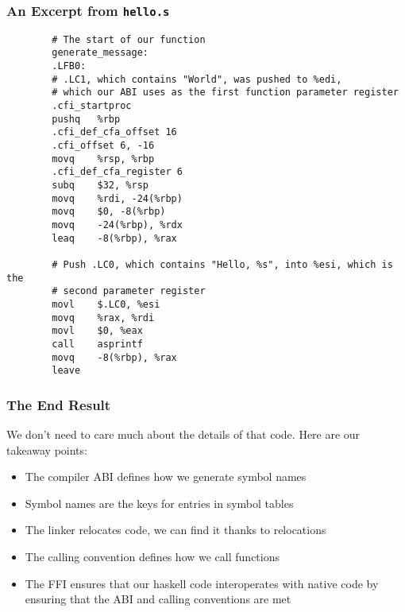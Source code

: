 \documentclass{beamer}
\begin{document}
\begin{frame}[fragile]
    \frametitle{An Excerpt from {\tt hello.s}}

    \begin{tiny}
        \begin{verbatim}
        # The start of our function
        generate_message:
        .LFB0:
        # .LC1, which contains "World", was pushed to %edi,
        # which our ABI uses as the first function parameter register
        .cfi_startproc
        pushq   %rbp
        .cfi_def_cfa_offset 16
        .cfi_offset 6, -16
        movq    %rsp, %rbp
        .cfi_def_cfa_register 6
        subq    $32, %rsp
        movq    %rdi, -24(%rbp)
        movq    $0, -8(%rbp)
        movq    -24(%rbp), %rdx
        leaq    -8(%rbp), %rax

        # Push .LC0, which contains "Hello, %s", into %esi, which is the
        # second parameter register
        movl    $.LC0, %esi
        movq    %rax, %rdi
        movl    $0, %eax
        call    asprintf
        movq    -8(%rbp), %rax
        leave
        \end{verbatim}
    \end{tiny}
\end{frame}

\begin{frame}
    \frametitle{The End Result}

    We don't need to care much about the details of that code.  Here are our
    takeaway points:

    \begin{itemize}
        \item{The compiler ABI defines how we generate symbol names}
        \item{Symbol names are the keys for entries in symbol tables}
        \item{The linker relocates code, we can find it thanks to relocations}
        \item{The calling convention defines how we call functions}
        \item{The FFI ensures that our haskell code interoperates with native
            code by ensuring that the ABI and calling conventions are met}
    \end{itemize}
\end{frame}
\end{document}
